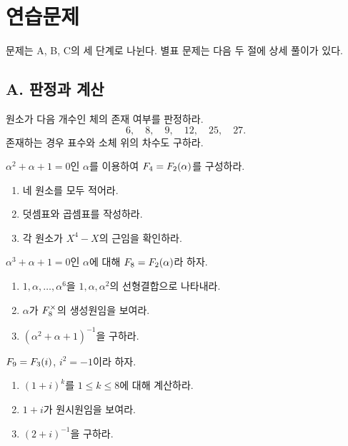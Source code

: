 \section{연습문제}
\label{sec:finite-field-exercises}

문제는 A, B, C의 세 단계로 나뉜다. 별표 문제는 다음 두 절에 상세 풀이가 있다.

\subsection*{A. 판정과 계산}

\begin{exercise}
원소가 다음 개수인 체의 존재 여부를 판정하라.
\[
  6,\quad8,\quad9,\quad12,\quad25,\quad27.
\]
존재하는 경우 표수와 소체 위의 차수도 구하라.
\end{exercise}

\begin{exercise}[*]
$\alpha^2+\alpha+1=0$인 $\alpha$를 이용하여 $F_4=F_2(\alpha)$를 구성하라.
\begin{enumerate}[label=(\alph*)]
  \item 네 원소를 모두 적어라.
  \item 덧셈표와 곱셈표를 작성하라.
  \item 각 원소가 $X^4-X$의 근임을 확인하라.
\end{enumerate}
\end{exercise}

\begin{exercise}[*]
$\alpha^3+\alpha+1=0$인 $\alpha$에 대해 $F_8=F_2(\alpha)$라 하자.
\begin{enumerate}[label=(\alph*)]
  \item $1,\alpha,\dots,\alpha^6$을 $1,\alpha,\alpha^2$의 선형결합으로 나타내라.
  \item $\alpha$가 $F_8^\times$의 생성원임을 보여라.
  \item $(\alpha^2+\alpha+1)^{-1}$을 구하라.
\end{enumerate}
\end{exercise}

\begin{exercise}
$F_9=F_3(i)$, $i^2=-1$이라 하자.
\begin{enumerate}[label=(\alph*)]
  \item $(1+i)^k$를 $1\le k\le8$에 대해 계산하라.
  \item $1+i$가 원시원임을 보여라.
  \item $(2+i)^{-1}$을 구하라.
\end{enumerate}
\end{exercise}

